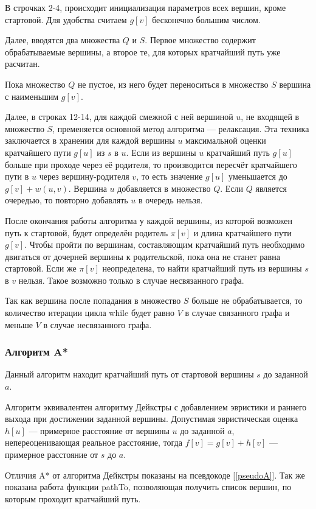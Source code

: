 В строчках 2-4, происходит инициализация параметров всех вершин, кроме стартовой. Для удобства считаем $g[v]$ бесконечно большим числом.

Далее, вводятся два множества $Q$ и $S$. Первое множество содержит обрабатываемые вершины, а второе те, для которых кратчайший путь уже расчитан.

Пока множество $Q$ не пустое, из него будет переноситься в множество $S$ вершина с наименьшим $g[v]$.

Далее, в строках 12-14, для каждой смежной с ней вершиной $u$, не входящей в множество $S$, пременяется основной метод алгоритма — релаксация. Эта техника заключается в хранении для каждой вершины $u$ максимальной оценки кратчайшего пути $g[u]$ из $s$ в $u$. Если из вершины $u$ кратчайший путь $g[u]$ больше при проходе через её родителя, то производится пересчёт кратчайшего пути в $u$ через вершину-родителя $v$, то есть значение $g[u]$ уменьшается до $g[v] + w(u,v)$. Вершина $u$ добавляется в множество $Q$. Если $Q$ является очередью, то повторно добавлять $u$ в очередь нельзя.

После окончания работы алгоритма у каждой вершины, из которой возможен путь к стартовой, будет определён родитель $\pi[v]$ и длина кратчайшего пути $g[v]$. Чтобы пройти по вершинам, составляющим кратчайший путь необходимо двигаться от дочерней вершины к родительской, пока она не станет равна стартовой. Если же $\pi[v]$ неопределена, то найти кратчайший путь из вершины $s$ в $v$ нельзя. Такое возможно только в случае несвязанного графа.

Так как вершина после попадания в множество $S$ больше не обрабатывается, то количество итерации цикла while будет равно $V$ в случае связанного графа и меньше $V$ в случае несвязанного графа.

\subsubsection{Алгоритм A*}
Данный алгоритм находит кратчайший путь от стартовой вершины $s$ до заданной $a$.

Алгоритм эквивалентен алгоритму Дейкстры с добавлением эвристики и раннего выхода при достижении заданной вершины. Допустимая эвристическая оценка $h[u]$ — примерное расстояние от вершины $u$ до заданной $a$, непереоценивающая реальное расстояние, тогда $f[v] = g[v] + h[v]$ — примерное расстояние от $s$ до $a$.

Отличия A* от алгоритма Дейкстры показаны на псевдокоде [\ref{pseudoA}]. Так же показана работа функции pathTo, позволяющая получить список вершин, по которым проходит кратчайший путь.

